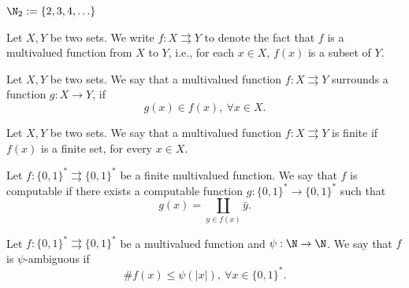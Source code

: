 
$\N_2 := \{2,3,4,\ldots\}$

\begin{definition}\label{def:multivalued_function}
    Let $X,Y$ be two sets. We write $f: X \rightrightarrows Y$ to denote the fact that $f$ is a multivalued function from $X$ to $Y$, i.e., for each $x \in X$, $f(x)$ is a subset of $Y$.
\end{definition}

\begin{definition}\label{def:surrounding_multivalued_function}
    Let $X,Y$ be two sets. We say that a multivalued function $f: X \rightrightarrows Y$ surrounds a function $g : X \to Y$, if
    \begin{equation}
        g(x) \in f(x), \ \forall x \in X.
    \end{equation}
\end{definition}

\begin{doubtfulsec}
\begin{definition}\label{def:finite_multivalued_function}
    Let $X,Y$ be two sets. We say that a multivalued function $f : X \rightrightarrows Y$ is finite if $f(x)$ is a finite set, for every $x \in X$.
\end{definition}
\end{doubtfulsec}

\begin{definition}\label{def:computable_multivalued_function}
    Let $f: \{0,1\}^\ast \rightrightarrows \{0,1\}^\ast$ be a finite multivalued function. We say that $f$ is computable if there exists a computable function $g : \{0,1\}^\ast \to \{0,1\}^\ast$ such that 
    \begin{equation}
        g(x) = \coprod_{y \in f(x)} \bar{y}. 
    \end{equation}
\end{definition}

\begin{definition}\label{def:ambiguous_multivalued_function}
    Let $f: \{0,1\}^\ast \rightrightarrows \{0,1\}^\ast$ be a multivalued function and $\psi : \N \to \N$. We say that $f$ is $\psi$-ambiguous if 
    \begin{equation}
        \# f(x) \leq \psi(|x|), \ \forall x \in \{0,1\}^\ast.
    \end{equation}
\end{definition}

